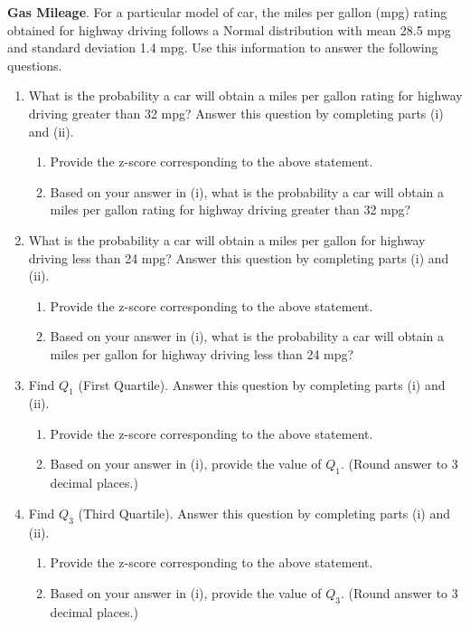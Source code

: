 \item \textbf{Gas Mileage}.  For a particular model of car, the miles per gallon (mpg) rating obtained for highway driving follows a Normal distribution with mean 28.5 mpg and standard deviation 1.4 mpg.  Use this information to answer the following questions.

\begin{enumerate}
\item What is the probability a car will obtain a miles per gallon rating for highway driving greater than 32 mpg? Answer this question by completing parts (i) and (ii). 

\begin{enumerate}
\item Provide the z-score corresponding to the above statement. 
\item Based on your answer in (i), what is the probability a car will obtain a miles per gallon rating for highway driving greater than 32 mpg? 
\end{enumerate}

\item What is the probability a car will obtain a miles per gallon for highway driving less than 24 mpg? Answer this question by completing parts (i) and (ii). 

\begin{enumerate}
\item Provide the z-score corresponding to the above statement. 
\item Based on your answer in (i), what is the probability a car will obtain a miles per gallon for highway driving less than 24 mpg?
\end{enumerate}

\item Find $Q_1$ (First Quartile). Answer this question by completing parts (i) and (ii).  

\begin{enumerate}
\item Provide the z-score corresponding to the above statement. 
\item  Based on your answer in (i), provide the value of $Q_1$.  (Round answer to 3 decimal places.)
\end{enumerate}

\item Find $Q_3$ (Third Quartile). Answer this question by completing parts (i) and (ii).  

\begin{enumerate}
\item Provide the z-score corresponding to the above statement. 
\item Based on your answer in (i), provide the value of $Q_3$.  (Round answer to 3 decimal places.)
\end{enumerate}


\end{enumerate}
